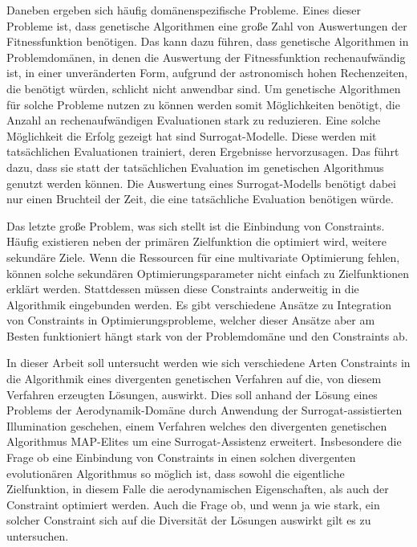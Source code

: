 Daneben ergeben sich häufig domänenspezifische Probleme.
Eines dieser Probleme ist, dass genetische Algorithmen eine große Zahl von Auswertungen der Fitnessfunktion benötigen.
Das kann dazu führen, dass genetische Algorithmen in Problemdomänen, in denen die Auswertung der Fitnessfunktion rechenaufwändig ist, in einer unveränderten Form,
aufgrund der astronomisch hohen Rechenzeiten, die benötigt würden, schlicht nicht anwendbar sind.
Um genetische Algorithmen für solche Probleme nutzen zu können werden somit Möglichkeiten benötigt, die Anzahl an rechenaufwändigen Evaluationen stark zu reduzieren.
Eine solche Möglichkeit die Erfolg gezeigt hat sind Surrogat-Modelle.
Diese werden mit tatsächlichen Evaluationen trainiert, deren Ergebnisse hervorzusagen.
Das führt dazu, dass sie statt der tatsächlichen Evaluation im genetischen Algorithmus genutzt werden können.
Die Auswertung eines Surrogat-Modells benötigt dabei nur einen Bruchteil der Zeit, die eine tatsächliche Evaluation benötigen würde.

Das letzte große Problem, was sich stellt ist die Einbindung von Constraints.
Häufig existieren neben der primären Zielfunktion die optimiert wird, weitere sekundäre Ziele.
Wenn die Ressourcen für eine multivariate Optimierung fehlen, können solche sekundären Optimierungsparameter nicht einfach zu Zielfunktionen erklärt werden.
Stattdessen müssen diese Constraints anderweitig in die Algorithmik eingebunden werden.
Es gibt verschiedene Ansätze zu Integration von Constraints in Optimierungsprobleme, welcher dieser Ansätze aber am Besten funktioniert hängt stark von der Problemdomäne und den Constraints ab.

In dieser Arbeit soll untersucht werden wie sich verschiedene Arten Constraints in die Algorithmik eines divergenten genetischen Verfahren auf die, von diesem Verfahren erzeugten Lösungen, auswirkt.
Dies soll anhand der Lösung eines Problems der Aerodynamik-Domäne durch Anwendung der Surrogat-assistierten Illumination geschehen, einem Verfahren welches den divergenten genetischen Algorithmus MAP-Elites um eine Surrogat-Assistenz erweitert.
Insbesondere die Frage ob eine Einbindung von Constraints in einen solchen divergenten evolutionären Algorithmus so möglich ist, dass sowohl die eigentliche Zielfunktion, in diesem Falle die aerodynamischen Eigenschaften, als auch der Constraint optimiert werden.
Auch die Frage ob, und wenn ja wie stark, ein solcher Constraint sich auf die Diversität der Lösungen auswirkt gilt es zu untersuchen.

% 
%


